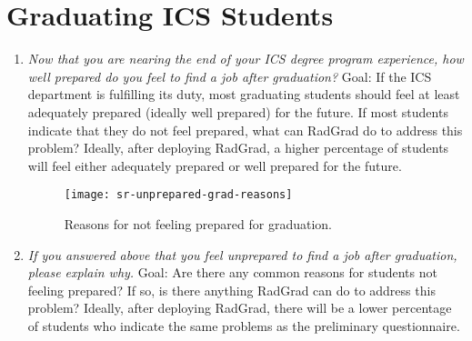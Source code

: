 \section{Graduating ICS Students}
\begin{enumerate}
\begin{figure}[h]
\centering
\texttt{[image: sr-prepared]}
\caption{Results for graduation preparedness.}
\end{figure}
\item \textit{Now that you are nearing the end of your ICS degree program experience, how well prepared do you feel to find a job after graduation?}
Goal: If the ICS department is fulfilling its duty, most graduating students should feel at least adequately prepared (ideally well prepared) for the future. If most students indicate that they do not feel prepared, what can RadGrad do to address this problem? Ideally, after deploying RadGrad, a higher percentage of students will feel either adequately prepared or well prepared for the future.
\begin{figure}[h]
\centering
\texttt{[image: sr-unprepared-grad-reasons]}
\caption{Reasons for not feeling prepared for graduation.}
\end{figure}
\item \textit{If you answered above that you feel unprepared to find a job after graduation, please explain why. }
Goal: Are there any common reasons for students not feeling prepared? If so, is there anything RadGrad can do to address this problem? Ideally, after deploying RadGrad, there will be a lower percentage of students who indicate the same problems as the preliminary questionnaire. 
\end{enumerate}


